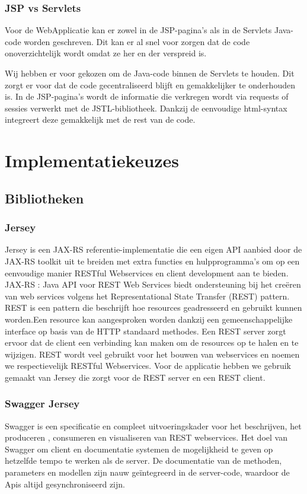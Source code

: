 \documentclass[pdftex,a4paper,12pt,twoside]{report}
\begin{document}
\subsection{JSP vs Servlets}
Voor de WebApplicatie kan er zowel in de JSP-pagina's als in de Servlets Java-code worden geschreven. Dit kan er al snel voor zorgen dat de code onoverzichtelijk wordt omdat ze her en der verspreid is.

Wij hebben er voor gekozen om de Java-code binnen de Servlets te houden. Dit zorgt er voor dat de code gecentraliseerd blijft en gemakkelijker te onderhouden is. In de JSP-pagina's wordt de informatie die verkregen wordt via requests of sessies verwerkt met de JSTL-bibliotheek. Dankzij de eenvoudige html-syntax integreert deze gemakkelijk met de rest van de code.

\chapter{Implementatiekeuzes}
\section{Bibliotheken}
\subsection{Jersey}

Jersey is een JAX-RS referentie-implementatie die een eigen API aanbied door de JAX-RS toolkit uit te breiden met extra functies en hulpprogramma's om op een eenvoudige manier RESTful Webservices en client development aan te bieden.
JAX-RS : Java API voor REST Web Services biedt ondersteuning bij het creëren van web services volgens het Representational State Transfer (REST) pattern.
REST is een pattern die beschrijft hoe resources geadresseerd en gebruikt kunnen worden.Een resource kan aangesproken worden dankzij een gemeenschappelijke interface op basis van de HTTP standaard methodes.
Een REST server zorgt ervoor dat de client een verbinding kan maken om de resources op te halen en te wijzigen. REST wordt veel gebruikt voor het bouwen van webservices en noemen we respectievelijk RESTful Webservices.
Voor de applicatie hebben we gebruik gemaakt van Jersey die zorgt voor de REST server en een REST client.


\subsection{Swagger Jersey}
Swagger is een specificatie en compleet uitvoeringskader voor het beschrijven, het produceren , consumeren en visualiseren van REST webservices. Het doel van Swagger om client en documentatie systemen de mogelijkheid te geven op hetzelfde tempo te werken als de server. De documentatie van de methoden, parameters en modellen zijn nauw geïntegreerd in de server-code, waardoor de Apis altijd gesynchroniseerd zijn.
\end{document}

